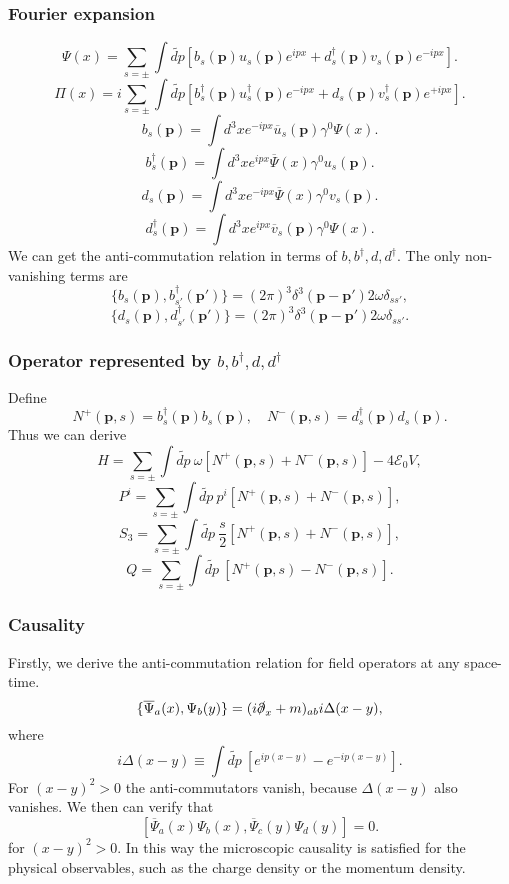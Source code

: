 \subsubsection{Fourier expansion}
\[\Psi(x) = \sum_{s = \pm} \int \widetilde{dp} \left[ b_s(\bm{p})u_s(\bm{p}) e^{ipx} + d^{\dagger}_s(\bm{p})v_s(\bm{p}) e^{-ipx}\right].\]
\[\Pi(x) = i\sum_{s = \pm} \int \widetilde{dp} \left[ b^{\dagger}_s(\bm{p})u^{\dagger}_s(\bm{p}) e^{-ipx} + d_s(\bm{p})v^{\dagger}_s(\bm{p}) e^{+ipx}\right].\]
\[b_s(\bm{p}) = \int d^3x e^{-ipx} \overline{u}_s(\bm{p}) \gamma^0 \Psi(x).\]
\[b^{\dagger}_s(\bm{p}) = \int d^3x e^{ipx} \overline{\Psi}(x) \gamma^0 u_s(\bm{p}).\]
\[d_s(\bm{p}) = \int d^3x e^{-ipx} \overline{\Psi}(x) \gamma^0 v_s(\bm{p}).\]
\[d^{\dagger}_s(\bm{p}) = \int d^3x e^{ipx} \overline{v}_s(\bm{p}) \gamma^0 \Psi(x).\]
We can get the anti-commutation relation in terms of $b,b^{\dagger},d,d^{\dagger}$. The only non-vanishing terms are
\[\{b_s(\bm{p}),b^{\dagger}_{s'}(\bm{p}')\} = (2\pi)^3 \delta^3(\bm{p}-\bm{p}')2\omega \delta_{ss'},\]
\[\{d_s(\bm{p}),d^{\dagger}_{s'}(\bm{p}')\} = (2\pi)^3 \delta^3(\bm{p}-\bm{p}')2\omega \delta_{ss'}.\]

\subsubsection{Operator represented by $b,b^{\dagger},d,d^{\dagger}$}
\noindent
Define
\[N^{+}(\bm{p},s) = b^{\dagger}_s(\bm{p}) b_s(\bm{p}) , \quad N^{-}(\bm{p},s) = d^{\dagger}_s(\bm{p}) d_s(\bm{p}).\]
Thus we can derive
\[ H = \sum_{s=\pm} \int \widetilde{dp} \: \omega \left[ N^{+}(\bm{p},s) + N^{-}(\bm{p},s)\right] - 4\mathcal{E}_0V,\]
\[ P^i = \sum_{s=\pm} \int \widetilde{dp} \: p^i \left[ N^{+}(\bm{p},s) + N^{-}(\bm{p},s)\right] ,\]
\[S_3 = \sum_{s=\pm} \int \widetilde{dp} \: \frac{s}{2} \left[ N^{+}(\bm{p},s) + N^{-}(\bm{p},s)\right],\]
\[Q = \sum_{s=\pm} \int \widetilde{dp} \: \left[ N^{+}(\bm{p},s) - N^{-}(\bm{p},s)\right].\]

\subsubsection{Causality}
\noindent
Firstly, we derive the anti-commutation relation for field operators at any space-time.
\[\{\overline{\Psi}_{a}(x),\Psi_{b}(y)\} = (i\slashed{\partial}_x + m)_{ab} i\Delta(x-y),\]
where
\[i\Delta(x-y) \equiv \int \widetilde{dp} \: [e^{ip(x-y)} - e^{-ip(x-y)}].\]
For $(x-y)^2 > 0$ the anti-commutators vanish, because $\Delta(x-y)$ also vanishes. 
We then can verify that
\[[\overline{\Psi}_{a}(x)\Psi_{b}(x),\overline{\Psi}_{c}(y)\Psi_{d}(y)] = 0.\]
for $(x-y)^2 > 0$.
In this way the microscopic causality is satisfied for the physical observables, such as the charge density or the momentum density.

